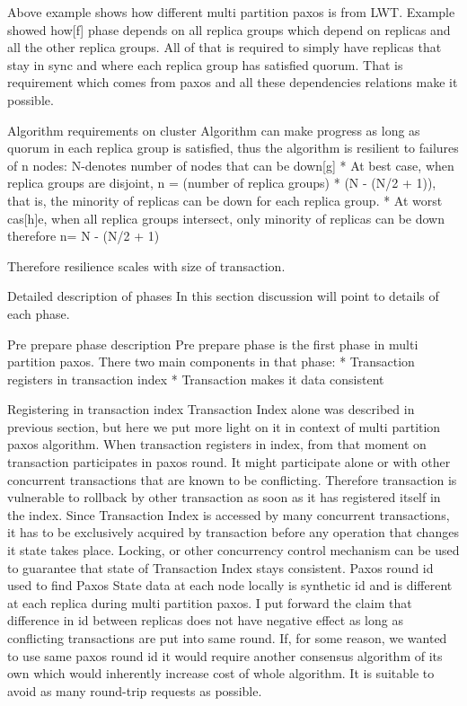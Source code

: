 Above example shows how different multi partition paxos is from LWT. Example showed how[f] phase depends on all replica groups which depend on replicas and all the other replica groups. All of that is required to simply have replicas that stay in sync and where each replica group has satisfied quorum. That is requirement which comes from paxos and all these dependencies relations make it possible.


Algorithm requirements on cluster
Algorithm can make progress as long as quorum in each replica group is satisfied, thus the algorithm is resilient to failures of n nodes:
        N-denotes number of nodes that can be down[g]
* At best case, when replica groups are disjoint, n = (number of replica groups) * (N - (N/2 + 1)), that is, the minority of replicas can be down for each replica group.
* At worst cas[h]e, when all replica groups intersect, only minority of replicas can be down therefore n= N - (N/2 + 1)


Therefore resilience scales with size of transaction.


        Detailed description of phases
In this section discussion will point to details of each phase.


Pre prepare phase description
Pre prepare phase is the first phase in multi partition paxos. There two main components in that phase:
* Transaction registers in transaction index 
* Transaction makes it data consistent


                Registering in transaction index
Transaction Index alone was described in previous section, but here we put more light on it in context of multi partition paxos algorithm. When transaction registers in index, from that moment on transaction participates in paxos round. It might participate alone or with other concurrent transactions that are known to be conflicting. Therefore transaction is vulnerable to rollback by other transaction as soon as it has registered itself in the index.
        Since Transaction Index is accessed by many concurrent transactions, it has to be exclusively acquired by transaction before any operation that changes it state takes place. Locking, or other concurrency control mechanism can be used to guarantee that state of Transaction Index stays consistent.
        Paxos round id used to find Paxos State data at each node locally is synthetic id and is different at each replica during multi partition paxos. I put forward the claim that difference in id between replicas does not have negative effect as long as conflicting transactions are put into same round. If, for some reason, we wanted to use same paxos round id it would require another consensus algorithm of its own which would inherently increase cost of whole algorithm. It is suitable to avoid as many round-trip requests as possible.
        
